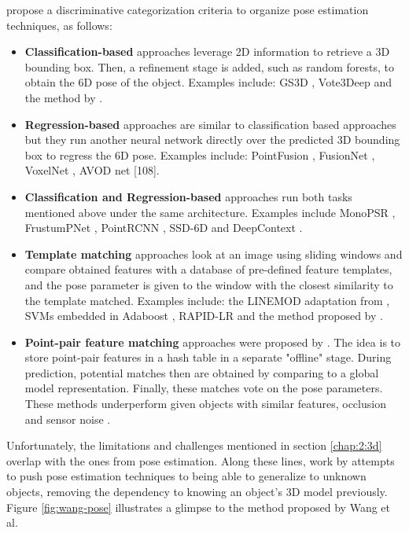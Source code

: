 \textcite{sahin2020review} propose a discriminative categorization criteria to organize pose estimation techniques, as follows:
\begin{itemize}
    \item \textbf{Classification-based} approaches leverage 2D information to retrieve a 3D bounding box. Then, a refinement stage is added, such as random forests, to obtain the 6D pose of the object. Examples include: GS3D \cite{li2019gs3d}, Vote3Deep \cite{engelcke2017vote3deep} and the method by \textcite{michel2017global}.
    \item \textbf{Regression-based} approaches are similar to classification based approaches but they run another neural network directly over the predicted 3D bounding box to regress the 6D pose. Examples include: PointFusion \cite{xu2018pointfusion}, FusionNet \cite{hegde2016fusionnet}, VoxelNet \cite{zhou2018voxelnet}, AVOD net [108].
    \item \textbf{Classification and Regression-based} approaches run both tasks mentioned above under the same architecture. Examples include MonoPSR \cite{Ku_2019}, FrustumPNet \cite{qi2018frustum}, PointRCNN \cite{shi2019pointrcnn}, SSD-6D \cite{kehl2017ssd} and DeepContext \cite{zhang2017deepcontext}.
    \item \textbf{Template matching} approaches look at an image using sliding windows and compare obtained features with a database of pre-defined feature templates, and the pose parameter is given to the window with the closest similarity to the template matched. Examples include: the LINEMOD adaptation from \textcite{hinterstoisser2012model}, SVMs embedded in Adaboost \cite{rios2013discriminatively}, RAPID-LR \cite{Munoz_2016} and the method proposed by \textcite{Ku_2018}.
    \item \textbf{Point-pair feature matching} approaches were proposed by \textcite{drost2010model}. The idea is to store point-pair features in a hash table in a separate "offline" stage. During prediction, potential matches then are obtained by comparing to a global model representation. Finally, these matches vote on the pose parameters. These methods underperform given objects with similar features, occlusion and sensor noise \cite{Mohamad_2014}. 
    \end{itemize}


    
Unfortunately, the limitations and challenges mentioned in section \ref{chap:2:3d} overlap with the ones from pose estimation. Along these lines, work by \textcite{Wang_2019} attempts to push pose estimation techniques to being able to generalize to unknown objects, removing the dependency to knowing an object's 3D model previously. Figure \ref{fig:wang-pose} illustrates a glimpse to the method proposed by Wang et al.


